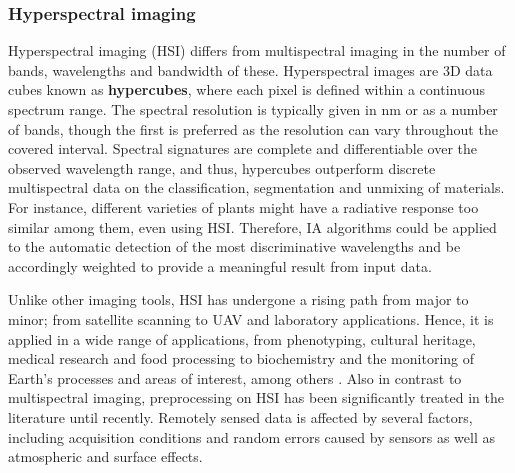 \subsubsection{Hyperspectral imaging}

Hyperspectral imaging (HSI) differs from multispectral imaging in the number of bands, wavelengths and bandwidth of these. Hyperspectral images are 3D data cubes known as \textbf{hypercubes}, where each pixel is defined within a continuous spectrum range. The spectral resolution is typically given in \si{\nano\meter} or as a number of bands, though the first is preferred as the resolution can vary throughout the covered interval. Spectral signatures are complete and differentiable over the observed wavelength range, and thus, hypercubes outperform discrete multispectral data on the classification, segmentation and unmixing of materials. For instance, different varieties of plants might have a radiative response too similar among them, even using HSI. Therefore, IA algorithms could be applied to the automatic detection of the most discriminative wavelengths and be accordingly weighted to provide a meaningful result from input data. 

Unlike other imaging tools, HSI has undergone a rising path from major to minor; from satellite scanning to UAV and laboratory applications. Hence, it is applied in a wide range of applications, from phenotyping, cultural heritage, medical research and food processing to biochemistry and the monitoring of Earth's processes and areas of interest, among others \cite{amigo_hyperspectral_2019, }. Also in contrast to multispectral imaging, preprocessing on HSI has been significantly treated in the literature until recently. Remotely sensed data is affected by several factors, including acquisition conditions and random errors caused by sensors as well as atmospheric and surface effects. 



